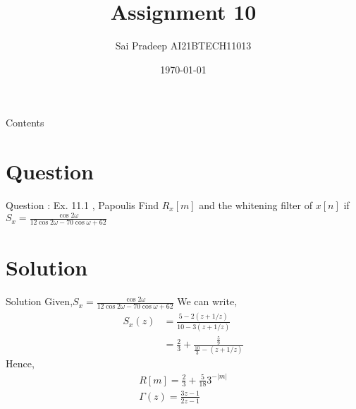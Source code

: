 \documentclass[journal,12pt,twocolumn]{beamer}
\title{Assignment 10}
\author{Sai Pradeep AI21BTECH11013}
\date {\today}
\begin{document}
\begin{frame}
 \maketitle   
\end{frame}

\begin{frame}{Contents}
    \tableofcontents
\end{frame}

\section{Question}
\begin{frame}{Question : Ex. 11.1 , Papoulis}
Find $R_{x}[m]$ and the whitening filter of $x[n]$ if 
$S_{x}=\frac{\cos{2\omega}}{12 \cos{2\omega}- 70 \cos{\omega}+62}$

\end{frame}
\section{Solution}
\begin{frame}{Solution}
Given,$S_{x}=\frac{\cos{2\omega}}{12 \cos{2\omega}- 70 \cos{\omega}+62}$ 
We can write,
\begin{align}
S_x(z)&=\frac{5-2(z+1/z)}{10-3(z+1/z)}\\
&=\frac{2}{3} + \frac{\frac{5}{9}}{\frac{10}{3}-(z+1/z)}
\end{align}
Hence,
\begin{align}
 R[m]=\frac{2}{3}+\frac{5}{18} 3^{-|m|}\\
  \Gamma(z)=\frac{3z-1}{2z-1} 
 \end{align}
\end{frame}
\end{document}
